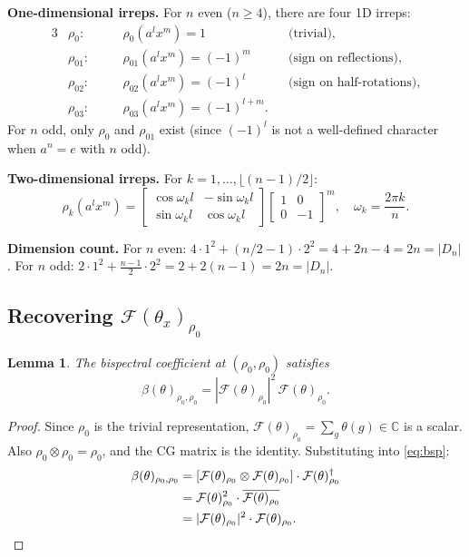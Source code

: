 \documentclass{article}
\newtheorem{lemma}[theorem]{Lemma}
\theoremstyle{definition}
\theoremstyle{remark}
\newcommand{\FF}{\mathcal{F}}
\newcommand{\C}{\mathbb{C}}
\begin{document}
\textbf{One-dimensional irreps.}
For $n$ even ($n \geq 4$), there are four 1D irreps:
\begin{alignat*}{3}
&\rho_0 : \quad &&\rho_0(a^l x^m) = 1 &&\text{(trivial),} \\
&\rho_{01} : \quad &&\rho_{01}(a^l x^m) = (-1)^m &&\text{(sign on reflections),} \\
&\rho_{02} : \quad &&\rho_{02}(a^l x^m) = (-1)^l &&\text{(sign on half-rotations),} \\
&\rho_{03} : \quad &&\rho_{03}(a^l x^m) = (-1)^{l+m}.
\end{alignat*}
For $n$ odd, only $\rho_0$ and $\rho_{01}$ exist (since $(-1)^l$ is not a well-defined character when $a^n = e$ with $n$ odd).

\textbf{Two-dimensional irreps.}
For $k = 1, \ldots, \lfloor(n-1)/2\rfloor$:
\begin{equation}\label{eq:dn_2d_irrep}
\rho_k(a^l x^m) = \begin{bmatrix} \cos\omega_k l & -\sin\omega_k l \\ \sin\omega_k l & \cos\omega_k l \end{bmatrix} \begin{bmatrix} 1 & 0 \\ 0 & -1 \end{bmatrix}^m, \quad \omega_k = \frac{2\pi k}{n}.
\end{equation}

\textbf{Dimension count.}
For $n$ even: $4 \cdot 1^2 + (n/2 - 1) \cdot 2^2 = 4 + 2n - 4 = 2n = |D_n|$.
For $n$ odd: $2 \cdot 1^2 + \frac{n-1}{2} \cdot 2^2 = 2 + 2(n-1) = 2n = |D_n|$.

\subsection{Recovering $\FF(\theta_x)_{\rho_0}$}

\begin{lemma}\label{lem:recover_rho0}
The bispectral coefficient at $(\rho_0, \rho_0)$ satisfies
\begin{equation}\label{eq:beta_00}
\beta(\theta)_{\rho_0, \rho_0} = |\FF(\theta)_{\rho_0}|^2\, \FF(\theta)_{\rho_0}.
\end{equation}
\end{lemma}
\begin{proof}
Since $\rho_0$ is the trivial representation, $\FF(\theta)_{\rho_0} = \sum_{g} \theta(g) \in \C$ is a scalar. Also $\rho_0 \otimes \rho_0 = \rho_0$, and the CG matrix is the identity. Substituting into \eqref{eq:bsp}:
\begin{align*}
\beta(\theta)_{\rho_0, \rho_0}
&= [\FF(\theta)_{\rho_0} \otimes \FF(\theta)_{\rho_0}] \cdot \FF(\theta)_{\rho_0}^\dagger \\
&= \FF(\theta)_{\rho_0}^2 \cdot \overline{\FF(\theta)_{\rho_0}} \\
&= |\FF(\theta)_{\rho_0}|^2 \cdot \FF(\theta)_{\rho_0}. \qedhere
\end{align*}
\end{proof}
\end{document}
